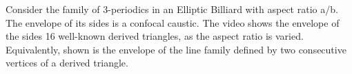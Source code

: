 Consider the family of 3-periodics in an Elliptic Billiard with aspect ratio a/b. The envelope of its sides is a confocal caustic. The video shows the envelope of the sides 16 well-known derived triangles, as the aspect ratio is varied. Equivalently, shown is the envelope of the line family defined by two consecutive vertices of a derived triangle.